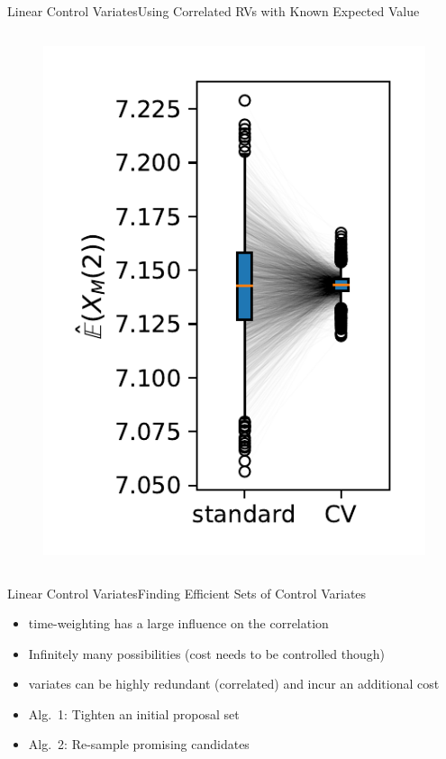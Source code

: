 \documentclass{beamer}
\newcommand{\bottomcite}[1]{\vspace*{\fill} {\scriptsize \parencite{#1}}}
\begin{document}
\begin{frame}{Linear Control Variates}{Using Correlated RVs with Known Expected Value}
\begin{columns}
\begin{column}{.38\textwidth}
\begin{figure}
                \includegraphics[width=\textwidth]{../gfx/reduction.pdf}
            \end{figure}
        \end{column}
    \end{columns}
    \bottomcite{backenkohler2019control}
\end{frame}

\begin{frame}{Linear Control Variates}{Finding Efficient Sets of Control Variates}
  \begin{itemize}
    \item time-weighting has a large influence on the correlation
    \item Infinitely many possibilities (cost needs to be controlled though)
    \item variates can be highly redundant (correlated) and incur an additional cost
    \item Alg.~1: Tighten an initial proposal set
    \item Alg.~2: Re-sample promising candidates
  \end{itemize}
    \bottomcite{backenkohler2019control,backenkohler2021variance}
\end{frame}
\end{document}
